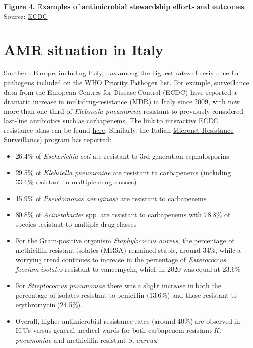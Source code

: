 \documentclass[
]{book}
\providecommand{\tightlist}{%
  \setlength{\itemsep}{0pt}\setlength{\parskip}{0pt}}
\begin{document}
\textbf{Figure 4. Examples of antimicrobial stewardship efforts and outcomes}. Source: \href{https://antibiotic.ecdc.europa.eu/en/infographics-about-antibiotic-stewardship-programmes}{ECDC}

\hypertarget{amr-situation-in-italy}{%
\section*{AMR situation in Italy}\label{amr-situation-in-italy}}

Southern Europe, including Italy, has among the highest rates of resistance for pathogens included on the WHO Priority Pathogen list. For example, surveillance data from the European Centres for Disease Control (ECDC) have reported a dramatic increase in multidrug-resistance (MDR) in Italy since 2009, with now more than one-third of \emph{Klebsiella pneumoniae} resistant to previously-considered last-line antibiotics such as carbapenems. The link to interactive ECDC resistance atlas can be found \href{https://atlas.ecdc.europa.eu/public/index.aspx?Dataset=27\&HealthTopic=4}{here}. Similarly, the Italian \href{https://www.epicentro.iss.it/antibiotico-resistenza/epidemiologia-italia}{Micronet Resistance Surveillance}) program has reported:

\begin{itemize}
\tightlist
\item
  26.4\% of \emph{Escherichia coli} are resistant to 3rd generation cephalosporins
\item
  29.5\% of \emph{Klebsiella pneumoniae} are resistant to carbapenems (including 33.1\% resistant to multiple drug classes)
\item
  15.9\% of \emph{Pseudomonas aeruginosa} are resistant to carbapenems
\item
  80.8\% of \emph{Acinetobacter} spp. are resistant to carbapenems with 78.8\% of species resistant to multiple drug classes
\item
  For the Gram-positive organism \emph{Staphylococcus aureus}, the percentage of methicillin-resistant isolates (MRSA) remained stable, around 34\%, while a worrying trend continues to increase in the percentage of \emph{Enterococcus faecium isolates} resistant to vancomycin, which in 2020 was equal at 23.6\%
\item
  For \emph{Streptococcus pneumoniae} there was a slight increase in both the percentage of isolates resistant to penicillin (13.6\%) and those resistant to erythromycin (24.5\%).
\item
  Overall, higher antimicrobial resistance rates (around 40\%) are observed in ICUs versus general medical wards for both carbapenem-resistant \emph{K. pneumoniae} and methicillin-resistant \emph{S. aureus}.
\end{itemize}
\end{document}
